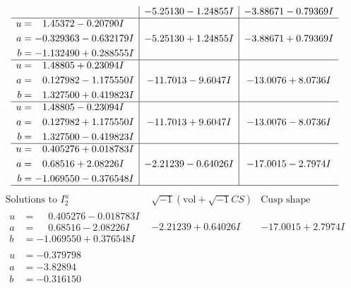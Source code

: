 \documentclass[1p]{elsarticle_modified}
\theoremstyle{definition}
\newcommand{\I}{\sqrt{-1}}
\begin{document}
$$\begin{array}{c|c|c}
 & -5.25130 - 1.24855 I & -3.88671 - 0.79369 I \\ \hline\begin{aligned}
u &= \phantom{-}1.45372 - 0.20790 I \\
a &= -0.329363 - 0.632179 I \\
b &= -1.132490 + 0.288555 I\end{aligned}
 & -5.25130 + 1.24855 I & -3.88671 + 0.79369 I \\ \hline\begin{aligned}
u &= \phantom{-}1.48805 + 0.23094 I \\
a &= \phantom{-}0.127982 - 1.175550 I \\
b &= \phantom{-}1.327500 + 0.419823 I\end{aligned}
 & -11.7013 - 9.6047 I & -13.0076 + 8.0736 I \\ \hline\begin{aligned}
u &= \phantom{-}1.48805 - 0.23094 I \\
a &= \phantom{-}0.127982 + 1.175550 I \\
b &= \phantom{-}1.327500 - 0.419823 I\end{aligned}
 & -11.7013 + 9.6047 I & -13.0076 - 8.0736 I \\ \hline\begin{aligned}
u &= \phantom{-}0.405276 + 0.018783 I \\
a &= \phantom{-}0.68516 + 2.08226 I \\
b &= -1.069550 - 0.376548 I\end{aligned}
 & -2.21239 - 0.64026 I & -17.0015 - 2.7974 I\\
 \hline 
 \end{array}$$\newpage$$\begin{array}{c|c|c}  
\text{Solutions to }I^u_{2}& \I (\text{vol} + \sqrt{-1}CS) & \text{Cusp shape}\\
 \hline 
\begin{aligned}
u &= \phantom{-}0.405276 - 0.018783 I \\
a &= \phantom{-}0.68516 - 2.08226 I \\
b &= -1.069550 + 0.376548 I\end{aligned}
 & -2.21239 + 0.64026 I & -17.0015 + 2.7974 I \\ \hline\begin{aligned}
u &= -0.379798\phantom{ +0.000000I} \\
a &= -3.82894\phantom{ +0.000000I} \\
b &= -0.316150\phantom{ +0.000000I}\end{aligned}

\end{array}$$
\end{document}

